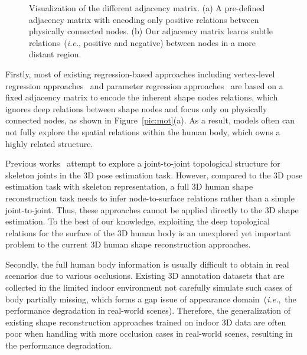 \documentclass[sigplan]{acmart}
\def\ie{\emph{i.e.}}
\begin{document}
\begin{figure}[htbp]
\centering
{}\centering
\caption{Visualization of the different adjacency matrix. (a) A pre-defined adjacency matrix with encoding only positive relations between physically connected nodes. (b) Our adjacency matrix learns subtle relations~(\ie, positive and negative) between nodes in a more distant region.}
\label{fig:compare_fig}
\end{figure}
Firstly, most of existing regression-based approaches including vertex-level regression approaches~\cite{kolotouros2019convolutional,Choi_2020_ECCV_Pose2Mesh} and parameter regression approaches~\cite{kanazawa2018end-to-end,pavlakos2018learning} are based on a fixed adjacency matrix to encode the inherent shape nodes relations, which ignores deep relations between shape nodes and focus only on physically connected nodes, as shown in Figure~\ref{pic:mot}(a). As a result, models often can not fully explore the spatial relations within the human body, which owns a highly related structure. 

Previous works~\cite{zhaoCVPR19semantic,Doosti_2020_CVPR} attempt to explore a joint-to-joint topological structure for skeleton joints in the 3D pose estimation task. However, compared to the 3D pose estimation task with skeleton representation, a full 3D human shape reconstruction task needs to infer node-to-surface relations rather than a simple joint-to-joint. Thus, these approaches cannot be applied directly to the 3D shape estimation. To the best of our knowledge, exploiting the deep topological relations for the surface of the 3D human body is an unexplored yet important problem to the current 3D human shape reconstruction approaches. 

Secondly, the full human body information is usually difficult to obtain in real scenarios due to various occlusions. Existing 3D annotation datasets that are collected in the limited indoor environment not carefully simulate such cases of body partially missing, which forms a gap issue of appearance domain~(\ie,~the performance degradation in real-world scenes). Therefore, the generalization of existing shape reconstruction approaches trained on indoor 3D data are often poor when handling with more occlusion cases in real-world scenes, resulting in the performance degradation.
\end{document}
